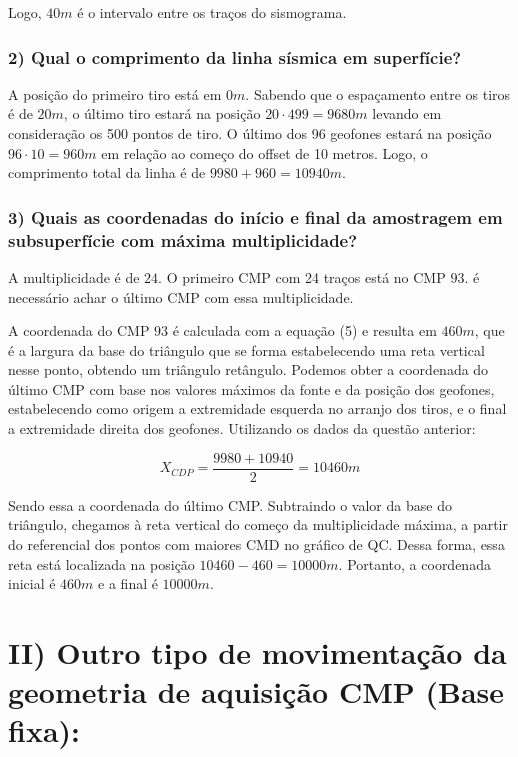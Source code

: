 \documentclass[12pt,a4paper]{article}
\begin{document}
Logo, $40m$ é o intervalo entre os traços do sismograma. 





\subsubsection{2) Qual o comprimento da linha sísmica em superfície?}



A posição do primeiro tiro está em $0m$. Sabendo que o espaçamento entre os tiros é de $20m$, o último tiro estará na posição $20 \cdot 499 = 9680m$ levando em consideração os 500 pontos de tiro. O último dos 96 geofones estará na posição $96\cdot10 = 960m$ em relação ao começo do offset de 10 metros. Logo, o comprimento total da linha é de $9980 + 960 = 10940m$.




\subsubsection{3) Quais as coordenadas do início e final da amostragem em subsuperfície com máxima multiplicidade?}

A multiplicidade é de $24$. O primeiro CMP com 24 traços está no CMP $93$. é necessário achar o último CMP com essa multiplicidade. 

A coordenada do CMP $93$ é calculada com a equação (5) e resulta em $460m$, que é a largura da base do triângulo que se forma estabelecendo uma reta vertical nesse ponto, obtendo um triângulo retângulo. Podemos obter a coordenada do último CMP com base nos valores máximos da fonte e da posição dos geofones, estabelecendo como origem a extremidade esquerda no arranjo dos tiros, e o final a extremidade direita dos geofones. Utilizando os dados da questão anterior:

$$X_{CDP} = \frac{9980 + 10940}{2} = 10460m$$

Sendo essa a coordenada do último CMP. Subtraindo o valor da base do triângulo, chegamos à reta vertical do começo da multiplicidade máxima, a partir do referencial dos pontos com maiores CMD no gráfico de QC. Dessa forma, essa reta está localizada na posição $10460 - 460 = 10000m$. Portanto, a coordenada inicial é $460m$ e a final é $10000m$. 








\newpage
\section{II) Outro tipo de movimentação da geometria de aquisição CMP (Base fixa):}
\end{document}
